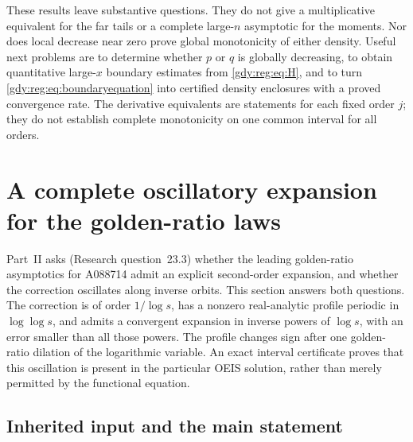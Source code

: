 \documentclass[11pt]{article}
\numberwithin{equation}{section}
\theoremstyle{definition}
\theoremstyle{remark}
\begin{document}
These results leave substantive questions.  They do not give a
multiplicative equivalent for the far tails or a complete large-$n$
asymptotic for the moments.  Nor does local decrease near zero prove
global monotonicity of either density.  Useful next problems are to
determine whether $p$ or $q$ is globally decreasing, to obtain
quantitative large-$x$ boundary estimates from \eqref{gdy:reg:eq:H}, and to
turn \eqref{gdy:reg:eq:boundaryequation} into certified density enclosures
with a proved convergence rate.  The derivative equivalents are
statements for each fixed order $j$; they do not establish complete
monotonicity on one common interval for all orders.



\section{A complete oscillatory expansion for the golden-ratio laws}
\label{gdy:dyn:sec:main}

Part~II asks (Research question~23.3) whether the leading golden-ratio
asymptotics for A088714 admit an explicit second-order expansion, and whether the
correction oscillates along inverse orbits. This section answers both
questions. The correction is of order $1/\log s$, has a nonzero
real-analytic profile periodic in $\log\log s$, and admits a convergent
expansion in inverse powers of $\log s$, with an error smaller than all
those powers. The profile changes sign after one
golden-ratio dilation of the logarithmic variable. An exact interval
certificate proves that this oscillation is present in the particular
OEIS solution, rather than merely permitted by the functional equation.

\subsection{Inherited input and the main statement}
\label{gdy:dyn:sub:input}
\end{document}
